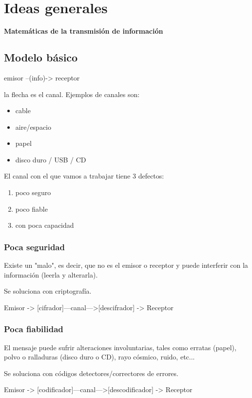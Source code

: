 \chapter{Ideas generales}


\textbf{Matemáticas de la transmisión de información}

\section{Modelo básico}

	emisor --(info)-> receptor

	la flecha es el canal. Ejemplos de canales son:

	\begin{itemize}
		\item cable
		\item aire/espacio
		\item papel
		\item disco duro / USB / CD
	\end{itemize}

	El canal con el que vamos a trabajar tiene 3 defectos:

	\begin{enumerate}
		\item poco seguro
		\item poco fiable
		\item con poca capacidad
	\end{enumerate}


	\subsection{Poca seguridad}
		Existe un "malo", es decir, que no es el emisor o receptor y puede interferir con la información (leerla y alterarla).

		Se soluciona con criptografía.

		Emisor -> [cifrador]---canal--->[descifrador] -> Receptor

	\subsection{Poca fiabilidad}
		El mensaje puede sufrir alteraciones involuntarias, tales como erratas (papel), polvo o ralladuras (disco duro o CD), rayo cósmico, ruido, etc...

		Se soluciona con códigos detectores/correctores de errores.

		Emisor -> [codificador]---canal--->[descodificador] -> Receptor

